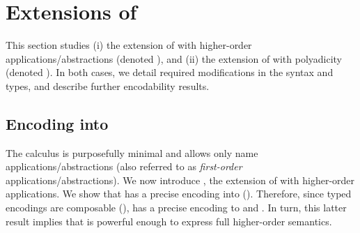 \section{Extensions of \HOp}
\label{sec:extension}

This section studies (i) the extension of \HOp with higher-order applications/abstractions (denoted \HOpp), and (ii) the extension of \HOp with polyadicity (denoted \pHOp). In both cases, we detail required modifications in the syntax and types, and describe further encodability results.

\subsection{Encoding \HOpp into \HOp}

The \HOp calculus is purposefully minimal and allows
only name applications/abstractions (also referred to as \emph{first-order} applications/abstractions).
We now introduce \HOpp, the 
extension of \HOp with higher-order applications.
We show that \HOpp has a precise encoding
into \HOp (). 
Therefore, since 
typed encodings are composable (), 
\HOpp has a precise encoding to \HO and \sessp.
In turn, this latter result implies that \HO is powerful
enough to express full higher-order semantics.


